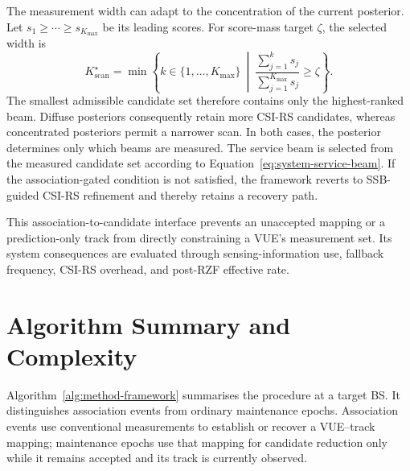 The measurement width can adapt to the concentration of the current posterior.  Let \(s_1\geq\cdots\geq s_{K_{\max}}\) be its leading scores.  For score-mass target \(\zeta\), the selected width is
\begin{equation}
    K^{\star}_{\mathrm{scan}}
    =
    \min\left\{k\in\{1,\ldots,K_{\max}\}\ \middle|\
    \frac{\sum_{j=1}^{k}s_j}{\sum_{j=1}^{K_{\max}}s_j}\geq\zeta\right\}.
    \label{eq:method-adaptive-scan}
\end{equation}
The smallest admissible candidate set therefore contains only the highest-ranked beam.
Diffuse posteriors consequently retain more CSI-RS candidates, whereas
concentrated posteriors permit a narrower scan.  In both cases, the posterior
determines only which beams are measured.  The service beam is selected from the
measured candidate set according to Equation~\eqref{eq:system-service-beam}.  If
the association-gated condition is not satisfied, the framework reverts to
SSB-guided CSI-RS refinement and thereby retains a recovery path.

This association-to-candidate interface prevents an unaccepted mapping or a
prediction-only track from directly constraining a VUE's measurement set.  Its
system consequences are evaluated through sensing-information use, fallback
frequency, CSI-RS overhead, and post-RZF effective rate.

\section{Algorithm Summary and Complexity}
\label{sec:method-algorithm}

Algorithm~\ref{alg:method-framework} summarises the procedure at a target BS.
It distinguishes association events from ordinary maintenance epochs.
Association events use conventional measurements to establish or recover a
VUE--track mapping; maintenance epochs use that mapping for candidate reduction
only while it remains accepted and its track is currently observed.

